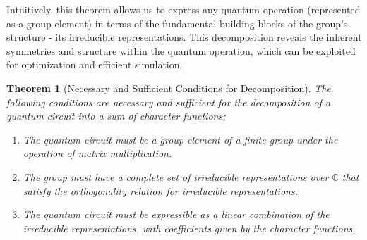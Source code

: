 \documentclass[11pt,a4paper]{article}
\newtheorem{theorem}{Theorem}
\begin{document}
Intuitively, this theorem allows us to express any quantum operation (represented as a group element) in terms of the fundamental building blocks of the group's structure - its irreducible representations. This decomposition reveals the inherent symmetries and structure within the quantum operation, which can be exploited for optimization and efficient simulation.

\begin{theorem}[Necessary and Sufficient Conditions for Decomposition]
\label{thm:nec_suf}
The following conditions are necessary and sufficient for the decomposition of a quantum circuit into a sum of character functions:
\begin{enumerate}
\item The quantum circuit must be a group element of a finite group under the operation of matrix multiplication.
\item The group must have a complete set of irreducible representations over $\mathbb{C}$ that satisfy the orthogonality relation for irreducible representations.
\item The quantum circuit must be expressible as a linear combination of the irreducible representations, with coefficients given by the character functions.
\end{enumerate}
\end{theorem}
\end{document}
